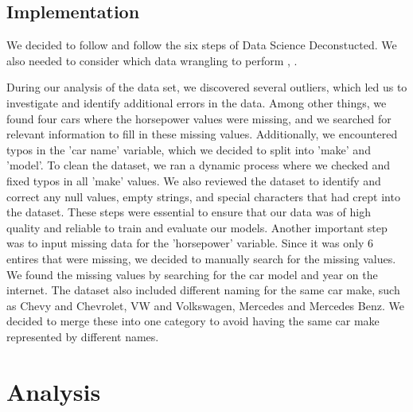 \documentclass[a4paper, twocolumn]{article}
\begin{document}
\subsection{Implementation}


We decided to follow \textcite{goldstein2017deconstructing} and follow the six steps of Data Science Deconstucted. We also needed to consider which data wrangling to perform \textcite{endel2015data}, \textcite{langer2023python}. 

During our analysis of the data set, we discovered several outliers, which led us to investigate and identify additional errors in the data. Among other things, we found four cars where the horsepower values were missing, and we searched for relevant information to fill in these missing values. Additionally, we encountered typos in the 'car name' variable, which we decided to split into 'make' and 'model'. To clean the dataset, we ran a dynamic process where we checked and fixed typos in all 'make' values. We also reviewed the dataset to identify and correct any null values, empty strings, and special characters that had crept into the dataset. These steps were essential to ensure that our data was of high quality and reliable to train and evaluate our models. Another important step was to input missing data for the 'horsepower' variable. Since it was only 6 entires that were missing, we decided to manually search for the missing values. We found the missing values by searching for the car model and year on the internet. The dataset also included different naming for the same car make, such as Chevy and Chevrolet, VW and Volkswagen, Mercedes and Mercedes Benz. We decided to merge these into one category to avoid having the same car make represented by different names. 


\section{Analysis\label{sec:Analysis}}

\end{document}
